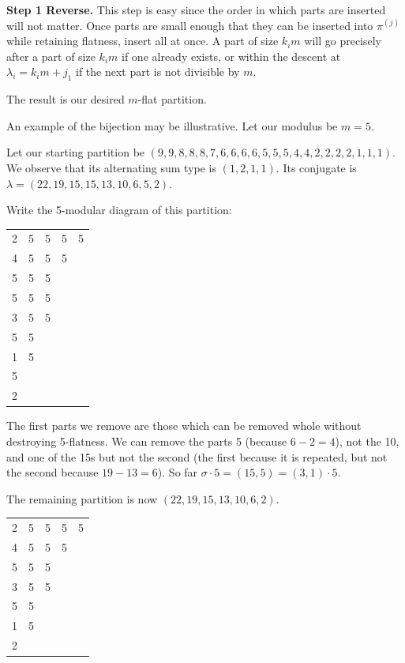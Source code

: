 \documentclass{amsart}
\begin{document}
\textbf{Step 1 Reverse.} This step is easy since the order in which parts are inserted will not matter.  Once parts are small enough that they can be inserted into $\pi^{(j)}$ while retaining flatness, insert all at once.  A part of size $k_i m$ will go precisely after a part of size $k_i m$ if one already exists, or within the descent at $\lambda_i = k_i m+j_1$ if the next part is not divisible by $m$.

The result is our desired $m$-flat partition.



An example of the bijection may be illustrative.  Let our modulus be $m=5$.

Let our starting partition be $(9,9,8,8,8,7,6,6,6,6,5,5,5,4,4,2,2,2,2,1,1,1)$.  We observe that its alternating sum type is $(1,2,1,1)$.  Its conjugate is $\lambda = (22,19, 15,15, 13,10,6,5,2)$.  

Write the 5-modular diagram of this partition:

\begin{center}
\begin{tabular}{ccccc}
2 & 5 & 5 & 5 & 5 \\
4 & 5 & 5 & 5 & \\
5 & 5 & 5 & & \\
5 & 5 & 5 & & \\
3 & 5 & 5 & & \\
5 & 5 & & & \\
1 & 5 & & & \\
5 & & & & \\
2 & & & & 
\end{tabular}
\end{center}

The first parts we remove are those which can be removed whole without destroying 5-flatness.  We can remove the parts 5 (because $6-2=4$), not the 10, and one of the 15s but not the second (the first because it is repeated, but not the second because $19-13 = 6$).  So far $\sigma \cdot 5 = (15, 5) = (3,1)\cdot 5$.

The remaining partition is now $(22,19, 15,13,10,6,2)$.

\begin{center}
\begin{tabular}{ccccc}
2 & 5 & 5 & 5 & 5 \\
4 & 5 & 5 & 5 & \\
5 & 5 & 5 & & \\
3 & 5 & 5 & & \\
5 & 5 & & & \\
1 & 5 & & & \\
2 & & & & 
\end{tabular}
\end{center}
\end{document}
